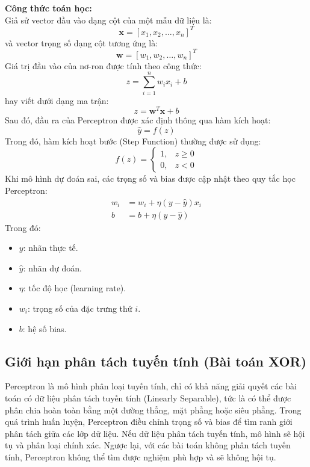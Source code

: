 \documentclass[12pt,a4paper]{report}
\begin{document}
\textbf{Công thức toán học:} \\
Giả sử vector đầu vào dạng cột của một mẫu dữ liệu là:
\begin{equation}
    \mathbf{x} = [x_1, x_2, \dots, x_n]^T
\end{equation}
và vector trọng số dạng cột tương ứng là:
\begin{equation}
    \mathbf{w} = [w_1, w_2, \dots, w_n]^T
\end{equation}
Giá trị đầu vào của nơ-ron được tính theo công thức:
\begin{equation}
    z = \sum_{i=1}^n w_i x_i + b
\end{equation}
hay viết dưới dạng ma trận:
\begin{equation}
    z = \mathbf{w}^T \mathbf{x} + b
\end{equation}
Sau đó, đầu ra của Perceptron được xác định thông qua hàm kích hoạt:
\begin{equation}
    \hat{y} = f(z)
\end{equation}
Trong đó, hàm kích hoạt bước (Step Function) thường được sử dụng:
\begin{equation}
    f(z) = \begin{cases} 1, & z \ge 0 \\ 0, & z < 0 \end{cases}
\end{equation}
Khi mô hình dự đoán sai, các trọng số và bias được cập nhật theo quy tắc học Perceptron:
\begin{align}
    w_i &= w_i + \eta(y - \hat{y})x_i \\
    b &= b + \eta(y - \hat{y})
\end{align}
Trong đó:
\begin{itemize}
    \item $y$: nhãn thực tế.
    \item $\hat{y}$: nhãn dự đoán.
    \item $\eta$: tốc độ học (learning rate).
    \item $w_i$: trọng số của đặc trưng thứ $i$.
    \item $b$: hệ số bias.
\end{itemize}

\subsection{Giới hạn phân tách tuyến tính (Bài toán XOR)}
Perceptron là mô hình phân loại tuyến tính, chỉ có khả năng giải quyết các bài toán có dữ liệu phân tách tuyến tính (Linearly Separable), tức là có thể được phân chia hoàn toàn bằng một đường thẳng, mặt phẳng hoặc siêu phẳng. Trong quá trình huấn luyện, Perceptron điều chỉnh trọng số và bias để tìm ranh giới phân tách giữa các lớp dữ liệu. Nếu dữ liệu phân tách tuyến tính, mô hình sẽ hội tụ và phân loại chính xác. Ngược lại, với các bài toán không phân tách tuyến tính, Perceptron không thể tìm được nghiệm phù hợp và sẽ không hội tụ.
\end{document}
